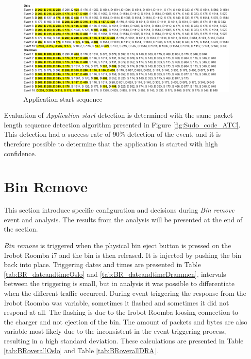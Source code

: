 \begin{figure}[H]
    \centering
    \includegraphics[width=\textwidth]{figures/Sequence_AS.png}
    \caption{Application start sequence}
    \label{fig:ASseq}
\end{figure}

Evaluation of \textit{Application start} detection is determined with the same packet length sequence detection algorithm presented in Figure \ref{fig:Sudo_code_ATC}. This detection had a success rate of 90\% detection of the event, and it is therefore possible to determine that the application is started with high confidence.

\section{Bin Remove}
This section introduce specific configuration and decisions during \textit{Bin remove} event and analysis. The results from the analysis will be presented at the end of the section.

\textit{Bin remove} is triggered when the physical bin eject button is pressed on the Irobot Roomba i7 and the bin is then released. It is injected by pushing the bin back into place. Triggering dates and times are presented in Table \ref{tab:BR_dateandtimeOslo} and \ref{tab:BR_dateandtimeDrammen}, intervals between the triggering is small, but in analysis it was possible to differentiate when the different traffic occurred. During event triggering the response from the Irobot Roomba was variable, sometimes it flashed and sometimes it did not respond at all. The flashing is due to the Irobot Roomba loosing connection to the charger and not ejection of the bin. The amount of packets and bytes are also variable most likely due to the inconsistent in the event triggering process, resulting in a high standard deviation. These calculations are presented in Table \ref{tab:BRoverallOslo} and Table \ref{tab:BRoverallDRA}. 

